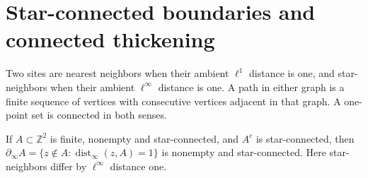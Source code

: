 \section{Star-connected boundaries and connected thickening}
\label{s:topology}

Two sites are nearest neighbors when their ambient \(\ell^1\)
distance is one, and star-neighbors when their ambient
\(\ell^\infty\) distance is one.  A path in either graph is
a finite sequence of vertices with consecutive vertices adjacent
in that graph.  A one-point set is connected in both senses.

\begin{lemma}\label{l:boundaryconn}
If \(A\subset\mathbb Z^2\) is finite, nonempty and star-connected,
and \(A^c\) is star-connected, then
\(\partial_\infty A=\{z\notin A:\operatorname{dist}_\infty(z,A)=1\}\)
is nonempty and star-connected.
Here star-neighbors differ by \(\ell^\infty\) distance one.
\end{lemma}

